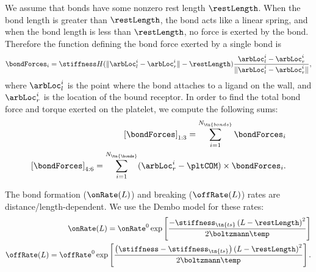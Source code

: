 We assume that bonds have some nonzero rest length $\restLength$. When
the bond length is greater than $\restLength$, the bond acts like a
linear spring, and when the bond length is less than $\restLength$, no
force is exerted by the bond. Therefore the function defining the bond
force exerted by a single bond is
\begin{equation}
  \label{eq:single-bond-force}
  \bondForces_i = \stiffness H(\|\arbLoc_l^i - \arbLoc_r^i\| -
  \restLength) \frac{\arbLoc_l^i - \arbLoc_r^i}{\|\arbLoc_l^i -
    \arbLoc_r^i\|},
\end{equation}
where $\arbLoc_l^i$ is the point where the bond attaches to a ligand
on the wall, and $\arbLoc_r^i$ is the location of the bound receptor.
In order to find the total bond force and torque exerted on the
platelet, we compute the following sums:
\begin{align}
  \left[\bondForces\right]_{1:3} = \sum_{i = 1}^{N_\tn{bonds}}
  \bondForces_i \label{eq:total-bond-force} \\
  \left[\bondForces\right]_{4:6} = \sum_{i = 1}^{N_\tn{\bonds}}
  (\arbLoc_r^i - \pltCOM) \times \bondForces_i.
\end{align}

The bond formation ($\onRate(L)$) and breaking ($\offRate(L)$) rates
are distance/length-dependent. We use the Dembo model \cite{Dembo1988}
for these rates:
\begin{align}
  \onRate(L) = \onRate^0 \exp\left[\frac{-\stiffness_\tn{ts} \left(L -
  \restLength \right)^2}{2 \boltzmann \temp}
  \right] \label{eq:dembo-on} \\
  \offRate(L) = \offRate^0 \exp\left[\frac{\left(\stiffness -
  \stiffness_\tn{ts} \right) \left(L - \restLength \right)^2}{2
  \boltzmann \temp} \right]. \label{eq:dembo-off}
\end{align}

